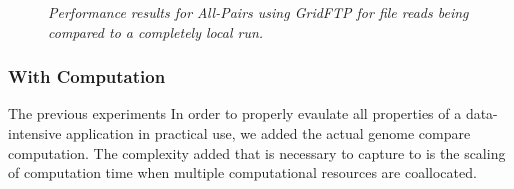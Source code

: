 \documentclass{rspublic}
\begin{document}
\begin{center}
\begin{figure}[ht]
\caption{\textit{Performance results for All-Pairs using GridFTP for
file reads being compared to a completely local run.}}
\label{Fig:ExpIConventionalLocal}
\end{figure}
\end{center}

\subsubsection{With Computation} 
The previous experiments 
In order to properly evaulate all properties of a data-intensive
application in practical use, we added the actual genome compare
computation.  The complexity added that is necessary to capture to is
the scaling of computation time when multiple computational resources are
coallocated.
\end{document}
